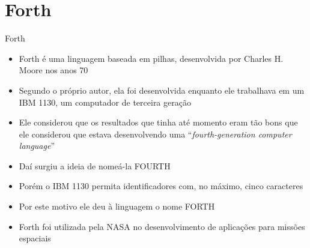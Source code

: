 \section{Forth}

\begin{frame}[fragile]{Forth}

    \begin{itemize}
        \item Forth é uma linguagem baseada em pilhas, desenvolvida por Charles H. Moore nos anos 70

        \item Segundo o próprio autor, ela foi desenvolvida enquanto ele trabalhava em um IBM 1130, 
            um computador de terceira geração

        \item Ele considerou que os resultados que tinha até momento eram tão bons que ele 
            considerou que estava desenvolvendo uma ``\textit{fourth-generation computer language}''

        \item Daí surgiu a ideia de nomeá-la FOURTH

        \item Porém o IBM 1130 permita identificadores com, no máximo, cinco caracteres

        \item Por este motivo ele deu à linguagem o nome FORTH

        \item Forth foi utilizada pela NASA no desenvolvimento de aplicações para missões espaciais

    \end{itemize}
\end{frame}

